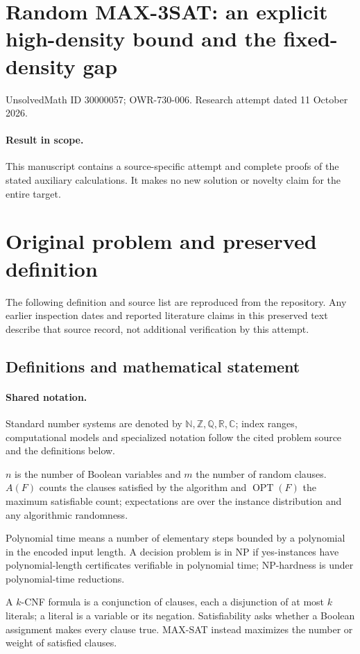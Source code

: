 \documentclass[11pt]{article}
\begin{document}
\section*{Random MAX-3SAT: an explicit high-density bound and the fixed-density gap}
\noindent UnsolvedMath ID 30000057; OWR-730-006. Research attempt dated 11 October 2026.
\paragraph{Result in scope.}This manuscript contains a source-specific attempt and complete proofs of the stated auxiliary calculations. It makes no new solution or novelty claim for the entire target.
\section{Original problem and preserved definition}
The following definition and source list are reproduced from the repository. Any earlier inspection dates and reported literature claims in this preserved text describe that source record, not additional verification by this attempt.
\subsection{Definitions and mathematical statement}

\paragraph{Shared notation.}Standard number systems are denoted by $\mathbb N,\mathbb Z,\mathbb Q,\mathbb R,\mathbb C$; index ranges, computational models and specialized notation follow the cited problem source and the definitions below.


$n$ is the number of Boolean variables and $m$ the number of random clauses. $A(F)$ counts the clauses satisfied by the algorithm and $\operatorname{OPT}(F)$ the maximum satisfiable count; expectations are over the instance distribution and any algorithmic randomness.

Polynomial time means a number of elementary steps bounded by a polynomial in the encoded input length. A decision problem is in $\mathrm{NP}$ if yes-instances have polynomial-length certificates verifiable in polynomial time; NP-hardness is under polynomial-time reductions.

A $k$-CNF formula is a conjunction of clauses, each a disjunction of at most $k$ literals; a literal is a variable or its negation. Satisfiability asks whether a Boolean assignment makes every clause true. MAX-SAT instead maximizes the number or weight of satisfied clauses.
\end{document}
